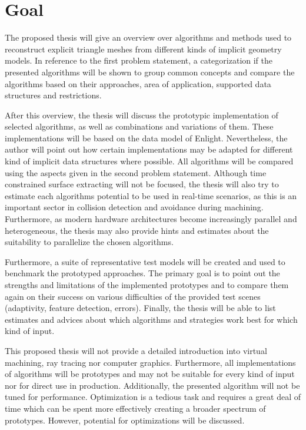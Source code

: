 
\section{Goal}

The proposed thesis will give an overview over algorithms and methods used to reconstruct explicit triangle meshes from different kinds of implicit geometry models. In reference to the first problem statement, a categorization if the presented algorithms will be shown to group common concepts and compare the algorithms based on their approaches, area of application, supported data structures and restrictions.

After this overview, the thesis will discuss the prototypic implementation of selected algorithms, as well as combinations and variations of them. These implementations will be based on the data model of Enlight. Nevertheless, the author will point out how certain implementations may be adapted for different kind of implicit data structures where possible. All algorithms will be compared using the aspects given in the second problem statement. Although time constrained surface extracting will not be focused, the thesis will also try to estimate each algorithms potential to be used in real-time scenarios, as this is an important sector in collision detection and avoidance during machining. Furthermore, as modern hardware architectures become increasingly parallel and heterogeneous, the thesis may also provide hints and estimates about the suitability to parallelize the chosen algorithms.

Furthermore, a suite of representative test models will be created and used to benchmark the prototyped approaches. The primary goal is to point out the strengths and limitations of the implemented prototypes and to compare them again on their success on various difficulties of the provided test scenes (\eg adaptivity, feature detection, errors). Finally, the thesis will be able to list estimates and advices about which algorithms and strategies work best for which kind of input.

This proposed thesis will not provide a detailed introduction into virtual machining, ray tracing nor computer graphics. Furthermore, all implementations of algorithms will be prototypes and may not be suitable for every kind of input nor for direct use in production. Additionally, the presented algorithm will not be tuned for performance. Optimization is a tedious task and requires a great deal of time which can be spent more effectively creating a broader spectrum of prototypes. However, potential for optimizations will be discussed.
